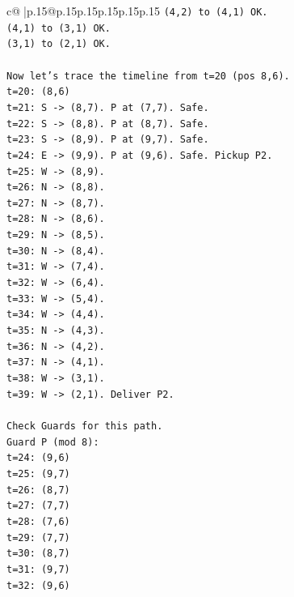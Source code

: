 \documentclass{article}
\begin{document}
{\begin{supertabular}{c@{$\;$}|p{.15\linewidth}@{}p{.15\linewidth}p{.15\linewidth}p{.15\linewidth}p{.15\linewidth}p{.15\linewidth}}
{{{\texttt{(4,2) to (4,1) OK.} \\
\texttt{(4,1) to (3,1) OK.} \\
\texttt{(3,1) to (2,1) OK.} \\
\\ 
\texttt{Now let's trace the timeline from t=20 (pos 8,6).} \\
\texttt{t=20: (8,6)} \\
\texttt{t=21: S {-}> (8,7). P at (7,7). Safe.} \\
\texttt{t=22: S {-}> (8,8). P at (8,7). Safe.} \\
\texttt{t=23: S {-}> (8,9). P at (9,7). Safe.} \\
\texttt{t=24: E {-}> (9,9). P at (9,6). Safe. Pickup P2.} \\
\texttt{t=25: W {-}> (8,9).} \\
\texttt{t=26: N {-}> (8,8).} \\
\texttt{t=27: N {-}> (8,7).} \\
\texttt{t=28: N {-}> (8,6).} \\
\texttt{t=29: N {-}> (8,5).} \\
\texttt{t=30: N {-}> (8,4).} \\
\texttt{t=31: W {-}> (7,4).} \\
\texttt{t=32: W {-}> (6,4).} \\
\texttt{t=33: W {-}> (5,4).} \\
\texttt{t=34: W {-}> (4,4).} \\
\texttt{t=35: N {-}> (4,3).} \\
\texttt{t=36: N {-}> (4,2).} \\
\texttt{t=37: N {-}> (4,1).} \\
\texttt{t=38: W {-}> (3,1).} \\
\texttt{t=39: W {-}> (2,1). Deliver P2.} \\
\\ 
\texttt{Check Guards for this path.} \\
\texttt{Guard P (mod 8):} \\
\texttt{t=24: (9,6)} \\
\texttt{t=25: (9,7)} \\
\texttt{t=26: (8,7)} \\
\texttt{t=27: (7,7)} \\
\texttt{t=28: (7,6)} \\
\texttt{t=29: (7,7)} \\
\texttt{t=30: (8,7)} \\
\texttt{t=31: (9,7)} \\
\texttt{t=32: (9,6)} \\
}}}
\end{supertabular}}
\end{document}
